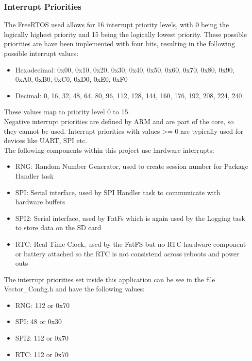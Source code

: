 \subsubsection{Interrupt Priorities}
The FreeRTOS used allows for 16 interrupt priority levels, with 0 being the logically highest priority and 15 being the logically lowest priority. These possible priorities are have been implemented with four bits, resulting in the following possible interrupt values:
\begin{itemize}
    \item Hexadecimal: 0x00, 0x10, 0x20, 0x30, 0x40, 0x50, 0x60, 0x70, 0x80, 0x90, 0xA0, 0xB0, 0xC0, 0xD0, 0xE0, 0xF0
    \item Decimal: 0, 16, 32, 48, 64, 80, 96, 112, 128, 144, 160, 176, 192, 208, 224, 240
\end{itemize}
These values map to priority level 0 to 15.\\
Negative interrupt priorities are defined by ARM and are part of the core, so they cannot be used. Interrupt priorities with values >= 0 are typically used for devices like UART, SPI etc.\\
The following components within this project use hardware interrupts:
\begin{itemize}
    \item RNG: Random Number Generator, used to create session number for Package Handler task
    \item SPI: Serial interface, used by SPI Handler task to communicate with hardware buffers
    \item SPI2: Serial interface, used by FatFs which is again used by the Logging task to store data on the SD card 
    \item RTC: Real Time Clock, used by the FatFS but no RTC hardware component or battery attached so the RTC is not consistend across reboots and power outs
\end{itemize}
The interrupt priorities set inside this application can be see in the file Vector\_Config.h and have the following values:
\begin{itemize}
    \item RNG: 112 or 0x70
    \item SPI: 48 or 0x30
    \item SPI2: 112 or 0x70
    \item RTC: 112 or 0x70
\end{itemize}
%
